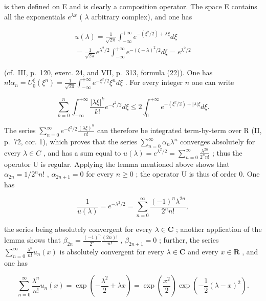 is then defined on E and is clearly a composition operator. The space E contains all the exponentials \(e^{\lambda x}\) ( \(\lambda\) arbitrary complex), and one has

\[
\begin{array}{l} u (\lambda) = \frac {1}{\sqrt {2 \pi}} \int_ {- \infty} ^ {+ \infty} e ^ {- (\xi^ {2} / 2) + \lambda \xi} d \xi \\ = \frac {1}{\sqrt {2 \pi}} e ^ {\lambda^ {2} / 2} \int_ {- \infty} ^ {+ \infty} e ^ {- (\xi - \lambda) ^ {2} / 2} d \xi = e ^ {\lambda^ {2} / 2} \end{array}
\]

(cf.~III, p.~120, exerc. 24, and VII, p.~313, formula (22)). One has \(n! \alpha_n = U_0^\xi (\xi^n) = \frac{1}{\sqrt{2\pi}} \int_{-\infty}^{+\infty} e^{-\xi^2 / 2} \xi^n d\xi\) . For every integer \(n\) one can write

\[
\sum_ {k = 0} ^ {n} \int_ {- \infty} ^ {+ \infty} \frac {| \lambda \xi | ^ {k}}{k !} e ^ {- \xi^ {2} / 2} d \xi \leqslant 2 \int_ {0} ^ {+ \infty} e ^ {- (\xi^ {2} / 2) + | \lambda | \xi} d \xi .
\]

The series \(\sum_{n=0}^{\infty}e^{-\xi^{2}/2}\frac{(\lambda\xi)^{n}}{n!}\) can therefore be integrated term-by-term over R (II, p.~72, cor. 1), which proves that the series \(\sum_{n=0}^{\infty}\alpha_{n}\lambda^{n}\) converges absolutely for every \(\lambda\in C\) , and has a sum equal to \(u(\lambda)=e^{\lambda^{2}/2}=\sum_{n=0}^{\infty}\frac{\lambda^{2n}}{2^{n}n!}\) ; thus the operator U is regular. Applying the lemma mentioned above shows that \(\alpha_{2n}=1/2^{n}n!\) , \(\alpha_{2n+1}=0\) for every \(n\geqslant0\) ; the operator U is thus of order 0. One has

\[
\frac {1}{u (\lambda)} = e ^ {- \lambda^ {2} / 2} = \sum_ {n = 0} ^ {\infty} \frac {(- 1) ^ {n} \lambda^ {2 n}}{2 ^ {n} n !},
\]

the series being absolutely convergent for every \(\lambda \in \mathbf{C}\) ; another application of the lemma shows that \(\beta_{2n} = \frac{(-1)^n}{2^n}\frac{(2n)!}{n!}\) , \(\beta_{2n+1} = 0\) ; further, the series \(\sum_{n=0}^{\infty}\frac{\lambda^n}{n!} u_n(x)\) is absolutely convergent for every \(\lambda \in \mathbf{C}\) and every \(x \in \mathbf{R}\) , and one has

\[
\sum_ {n = 0} ^ {\infty} \frac {\lambda^ {n}}{n !} u _ {n} (x) = \exp \left(- \frac {\lambda^ {2}}{2} + \lambda x\right) = \exp \left(\frac {x ^ {2}}{2}\right) \exp \left(- \frac {1}{2} (\lambda - x) ^ {2}\right).
\]

